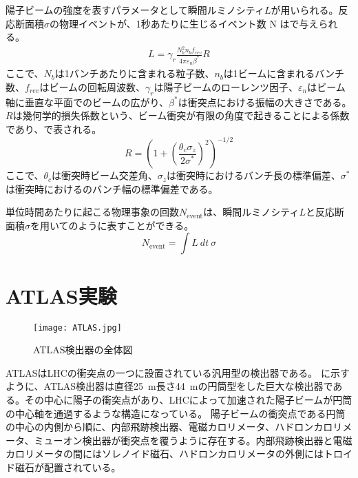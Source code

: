 陽子ビームの強度を表すパラメータとして瞬間ルミノシティ$L$が用いられる。反応断面積$\sigma$の物理イベントが、1秒あたりに生じるイベント数 N はで与えられる。
\begin{align}
  \label{eq:lumi}
  L = \gamma_{r} \frac{N_{b}^{2} n_{b} f_{rev}}{4\pi \varepsilon_{n} \beta^*}R
\end{align}
ここで、$N_{b}$は1バンチあたりに含まれる粒子数、$n_{b}$は1ビームに含まれるバンチ数、$f_{rev}$はビームの回転周波数、$\gamma_{r}$は陽子ビームのローレンツ因子、$\varepsilon_{n}$はビーム軸に垂直な平面でのビームの広がり、$\beta^{*}$は衝突点における振幅の大きさである。$R$は幾何学的損失係数という、ビーム衝突が有限の角度で起きることによる係数であり、で表される。
\begin{equation}
  \label{eq:kikaf}
  R=\left( 1+\left( \frac{\theta_{c}\sigma_{z}}{2\sigma^{*}} \right)^2 \right)^{-1/2}
\end{equation}
ここで、$\theta_c$は衝突時ビーム交差角、$\sigma_z$は衝突時におけるバンチ長の標準偏差、$\sigma^*$は衝突時におけるのバンチ幅の標準偏差である。

単位時間あたりに起こる物理事象の回数$N_\mathrm{event}$は、瞬間ルミノシティ$L$と反応断面積$\sigma$を用いてのように表すことができる。
\begin{equation}
  \label{eq:hannnou}
  N_\mathrm{event} = \int L\ dt\ \sigma
\end{equation}




\section{ATLAS実験}
\label{sec:ATLAS}
\begin{figure}[tbp]
  \centering
  \texttt{[image: ATLAS.jpg]}
  \caption[ATLAS検出器]{ATLAS検出器の全体図 \cite{ATLAS} }
  \label{fig:ATLAS}
\end{figure}


ATLASはLHCの衝突点の一つに設置されている汎用型の検出器である。 に示すように、ATLAS検出器は直径25\ \si{m}長さ44\ \si{m}の円筒型をした巨大な検出器である。その中心に陽子の衝突点があり、LHCによって加速された陽子ビームが円筒の中心軸を通過するような構造になっている。
陽子ビームの衝突点である円筒の中心の内側から順に、内部飛跡検出器、電磁カロリメータ、ハドロンカロリメータ、ミューオン検出器が衝突点を覆うように存在する。内部飛跡検出器と電磁カロリメータの間にはソレノイド磁石、ハドロンカロリメータの外側にはトロイド磁石が配置されている。



